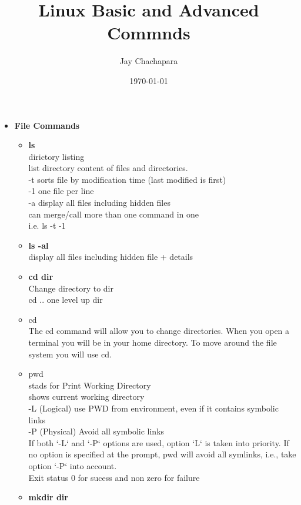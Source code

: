 \documentclass{article}
\title{Linux Basic and Advanced Commnds}
\author{Jay Chachapara}
\date{\today}
\begin{document}
	\maketitle
	\begin{itemize}
		\item \textbf{File Commands}
			\begin{itemize}
				\item \textbf{ls} \\					
					dirictory listing \\
					list directory content of files and directories.\\
					-t sorts file by modification time (last modified is first)\\
					-1 one file per line \\
					-a display all files including hidden files \\
					can merge/call more than one command in one \\ i.e. ls -t -1\\
				\item \textbf{ls -al} \\
					display all files including hidden file + details \\
				\item \textbf{cd dir} \\
					Change directory to dir\\
					cd .. one level up dir\\
				\item cd \\
					The cd command will allow you to change directories. When you open a terminal you will be in your home directory. To move around the file system you will use cd.\\
				\item pwd \\
					stads for Print Working Directory\\
					shows current working directory\\
					-L (Logical) use PWD from environment, even if it contains symbolic links\\
					-P (Physical) Avoid all symbolic links\\
					If both ‘-L‘ and ‘-P‘ options are used, option ‘L‘ is taken into priority. If no option is specified at the prompt, pwd will avoid all symlinks, i.e., take option ‘-P‘ into account.\\
					Exit status 0 for sucess and non zero for failure\\
				\item \textbf{mkdir dir}\\

\end{itemize}
\end{itemize}
\end{document}
